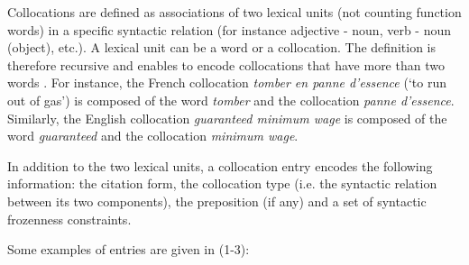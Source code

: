 \documentclass[output=paper]{langsci/langscibook}
\begin{document}

Collocations are defined as associations of two lexical units (not counting function words) in a specific syntactic relation (for instance adjective - noun, verb - noun (object), etc.). 
A lexical unit can be a word or a collocation. The definition is therefore recursive and enables to encode collocations that have more than two words \citep{nws10}. 
For instance, the French collocation \textit{tomber en panne d’essence} (`to run out of gas') is composed of the word \textit{tomber} and the collocation \textit{panne d’essence}. Similarly, the English collocation 
\textit{guaranteed minimum wage} is composed of the word \textit{guaranteed} and the collocation \textit{minimum wage}.

In addition to the two lexical units, a collocation entry encodes the following information: 
the citation form, the collocation type (i.e. the syntactic relation between its two components), the preposition (if any) and a set of syntactic frozenness constraints. 

Some examples of  entries are given in (1-3):\\

\hspace*{3mm}\parbox{10cm}{
  }


\vspace*{2mm}

\hspace*{3mm}\parbox{10cm}{
  }
  
\end{document}
